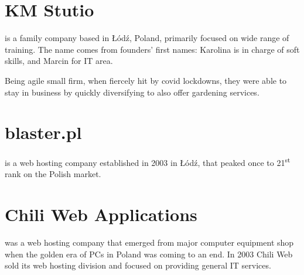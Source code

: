\documentclass[%
               doublesided,
               paper=a4,
               fontsize=10pt
              ]{my-resume}
\begin{document}
{    \section{KM Stutio}
        is a family company based in Łódź, Poland, primarily focused on wide range of training.
        The name comes from founders'
        first names:
        Karolina is in charge of soft skills, and Marcin for IT area.
        
        Being agile small firm, when fiercely hit by covid lockdowns, they were able
        to stay in business by quickly diversifying to also offer gardening services.
    
    \section{blaster.pl}
        is a web hosting company established in 2003 in Łódź,
        that peaked once to 21\textsuperscript{st} rank on the Polish market.
        
    \section{Chili Web Applications}
        was a web hosting company that emerged from major computer equipment
        shop when the golden era of PCs in Poland was coming to an end.
        In 2003 Chili Web sold
        its web hosting division and focused on providing general IT services.
    
}

\end{document}
